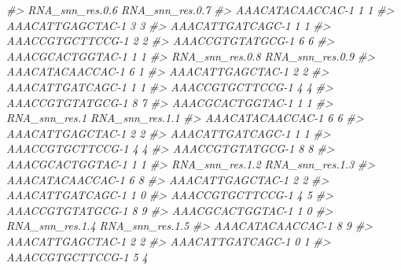 \documentclass[
]{book}
\newenvironment{Shaded}{\begin{snugshade}}{\end{snugshade}}
\newcommand{\CommentTok}[1]{\textcolor[rgb]{0.56,0.35,0.01}{\textit{#1}}}
\begin{document}
\begin{Shaded}
\begin{Highlighting}[]
\CommentTok{\#\textgreater{}                  RNA\_snn\_res.0.6 RNA\_snn\_res.0.7}
\CommentTok{\#\textgreater{} AAACATACAACCAC{-}1               1               1}
\CommentTok{\#\textgreater{} AAACATTGAGCTAC{-}1               3               3}
\CommentTok{\#\textgreater{} AAACATTGATCAGC{-}1               1               1}
\CommentTok{\#\textgreater{} AAACCGTGCTTCCG{-}1               2               2}
\CommentTok{\#\textgreater{} AAACCGTGTATGCG{-}1               6               6}
\CommentTok{\#\textgreater{} AAACGCACTGGTAC{-}1               1               1}
\CommentTok{\#\textgreater{}                  RNA\_snn\_res.0.8 RNA\_snn\_res.0.9}
\CommentTok{\#\textgreater{} AAACATACAACCAC{-}1               6               1}
\CommentTok{\#\textgreater{} AAACATTGAGCTAC{-}1               2               2}
\CommentTok{\#\textgreater{} AAACATTGATCAGC{-}1               1               1}
\CommentTok{\#\textgreater{} AAACCGTGCTTCCG{-}1               4               4}
\CommentTok{\#\textgreater{} AAACCGTGTATGCG{-}1               8               7}
\CommentTok{\#\textgreater{} AAACGCACTGGTAC{-}1               1               1}
\CommentTok{\#\textgreater{}                  RNA\_snn\_res.1 RNA\_snn\_res.1.1}
\CommentTok{\#\textgreater{} AAACATACAACCAC{-}1             6               6}
\CommentTok{\#\textgreater{} AAACATTGAGCTAC{-}1             2               2}
\CommentTok{\#\textgreater{} AAACATTGATCAGC{-}1             1               1}
\CommentTok{\#\textgreater{} AAACCGTGCTTCCG{-}1             4               4}
\CommentTok{\#\textgreater{} AAACCGTGTATGCG{-}1             8               8}
\CommentTok{\#\textgreater{} AAACGCACTGGTAC{-}1             1               1}
\CommentTok{\#\textgreater{}                  RNA\_snn\_res.1.2 RNA\_snn\_res.1.3}
\CommentTok{\#\textgreater{} AAACATACAACCAC{-}1               6               8}
\CommentTok{\#\textgreater{} AAACATTGAGCTAC{-}1               2               2}
\CommentTok{\#\textgreater{} AAACATTGATCAGC{-}1               1               0}
\CommentTok{\#\textgreater{} AAACCGTGCTTCCG{-}1               4               5}
\CommentTok{\#\textgreater{} AAACCGTGTATGCG{-}1               8               9}
\CommentTok{\#\textgreater{} AAACGCACTGGTAC{-}1               1               0}
\CommentTok{\#\textgreater{}                  RNA\_snn\_res.1.4 RNA\_snn\_res.1.5}
\CommentTok{\#\textgreater{} AAACATACAACCAC{-}1               8               9}
\CommentTok{\#\textgreater{} AAACATTGAGCTAC{-}1               2               2}
\CommentTok{\#\textgreater{} AAACATTGATCAGC{-}1               0               1}
\CommentTok{\#\textgreater{} AAACCGTGCTTCCG{-}1               5               4}

\end{Highlighting}
\end{Shaded}
\end{document}
